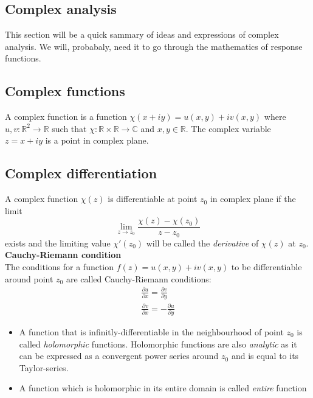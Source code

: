 \documentclass{article}
\newcommand{\eq}{\begin{equation}}
\newcommand{\qe}{\end{equation}}
\begin{document}
\begin{appendices}
\section{Complex analysis}

This section will be a quick sammary of ideas and expressions of complex analysis. We will, probabaly, need it to go through the mathematics of response functions.
\subsection{Complex functions}
 A complex function is a function $\chi(x+iy) = u(x,y) + i v(x,y)$ where $u, v: \mathbb{R}^{2}\rightarrow \mathbb{R}$ such that $\chi: \mathbb{R}\times\mathbb{R}\rightarrow \mathbb{C} $ and $x, y \in \mathbb{R}$. The complex variable $z = x +iy$ is a point in complex plane.  
\subsection{Complex differentiation}
A complex function $\chi(z)$ is differentiable at point $z_{0}$ in complex plane if the limit
\eq
\lim_{z \to z_{0}}\frac{\chi(z)-\chi(z_{0})}{z-z_{0}}
\qe
exists and the limiting value $\chi'(z_{0})$ will be called the \emph{derivative} of $\chi(z)$ at $z_{0}$.\\

\textbf{Cauchy-Riemann condition}\\
The conditions for a function $f(z) = u(x,y) + i v(x, y)$ to be differentiable around point $z_{0}$ are called Cauchy-Riemann conditions: 
\begin{eqnarray}
 \frac{\partial u}{\partial x} =  \frac{\partial v }{\partial y } \\
 \frac{\partial{v}}{\partial{x}}= -\frac{\partial{u}}{\partial{y}}
\end{eqnarray}
\begin{itemize}
\item A function that is infinitly-differentiable in the neighbourhood of point $z_{0}$ is called \emph{holomorphic} functions. Holomorphic functions are also \emph{analytic} as it can be expressed as a convergent power series around $z_{0}$ and is equal to its Taylor-series. 
\item A function which is holomorphic in its entire domain is called \emph{entire} function
\end{itemize}

\end{appendices}
\end{document}
